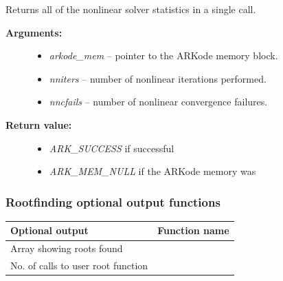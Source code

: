 \documentclass[letterpaper,10pt,english]{sphinxmanual}
\begin{document}
\begin{fulllineitems}
\label{c_interface/User_callable:ARKodeGetNonlinSolvStats}
Returns all of the nonlinear solver statistics in a single call.
\begin{description}
\item[{\textbf{Arguments:}}] \leavevmode\begin{itemize}
\item {} 
\emph{arkode\_mem} -- pointer to the ARKode memory block.

\item {} 
\emph{nniters} -- number of nonlinear iterations performed.

\item {} 
\emph{nncfails} -- number of nonlinear convergence failures.

\end{itemize}

\item[{\textbf{Return value:}}] \leavevmode\begin{itemize}
\item {} 
\emph{ARK\_SUCCESS} if successful

\item {} 
\emph{ARK\_MEM\_NULL} if the ARKode memory was 

\end{itemize}

\end{description}

\end{fulllineitems}



\subsubsection{Rootfinding optional output functions}
\label{c_interface/User_callable:rootfinding-optional-output-functions}\label{c_interface/User_callable:cinterface-arkoderootoutputs}
\begin{tabulary}{\linewidth}{|L|L|}
\hline
\textbf{
Optional output
} & \textbf{
Function name
}\\\hline

Array showing roots found
 & 
{\hyperref[c_interface/User_callable:ARKodeGetRootInfo]{}}
\\\hline

No. of calls to user root function
 & 
{\hyperref[c_interface/User_callable:ARKodeGetNumGEvals]{}}
\\\hline
\end{tabulary}
\end{document}
